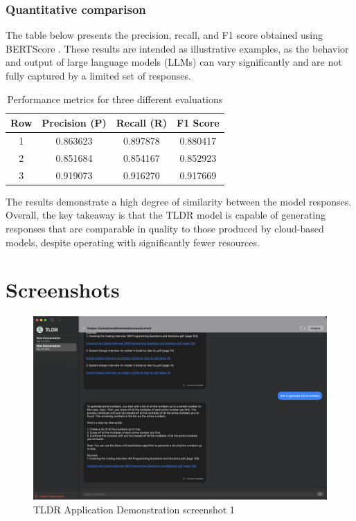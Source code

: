 \subsubsection{Quantitative comparison}
\label{subsubsec:tldrresultQuantitativecomparison}
The table below presents the precision, recall, and F1 score obtained using BERTScore \cite{bert-score}. These results are intended as illustrative examples, as the behavior and output of large language models (LLMs) can vary significantly and are not fully captured by a limited set of responses.

\begin{table}[h!]
\centering
\begin{tabular}{|c|c|c|c|}
\hline
\textbf{Row} & \textbf{Precision (P)} & \textbf{Recall (R)} & \textbf{F1 Score} \\
\hline
1 & 0.863623 & 0.897878 & 0.880417 \\
2 & 0.851684 & 0.854167 & 0.852923 \\
3 & 0.919073 & 0.916270 & 0.917669 \\
\hline
\end{tabular}
\caption{Performance metrics for three different evaluations}
\label{tab:metrics}
\end{table}
The results demonstrate a high degree of similarity between the model responses. Overall, the key takeaway is that the TLDR model is capable of generating responses that are comparable in quality to those produced by cloud-based models, despite operating with significantly fewer resources.
\section{Screenshots}
\label{SampleScreenshots}
\begin{figure}[h]
    \centering
    \includegraphics[width=1.0\linewidth]{images/result1.png}
    \caption{TLDR Application  Demonstration screenshot 1}
    \label{fig:tldrAppDemoSc1}
\end{figure}

